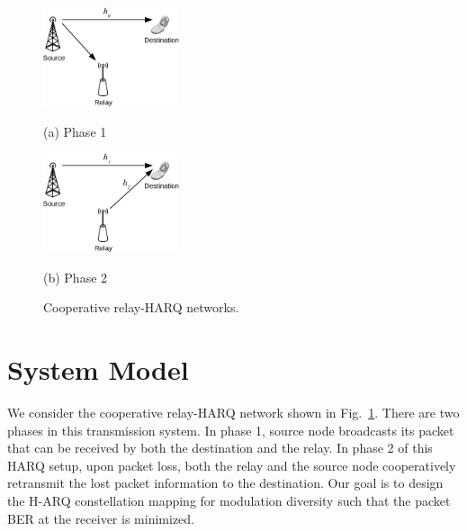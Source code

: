 \documentclass[journal,draftcls,onecolumn,12pt,twoside]{IEEEtran}
\begin{document}
\begin{figure}[!t]
    \begin{minipage}[b]{0.48\linewidth}
      \centering
      \centerline{\includegraphics[width=4.0cm]{./figs/relayHARQ1.eps}}
      \centerline{(a) Phase 1}\medskip
    \end{minipage}
    \hfill
    \begin{minipage}[b]{.48\linewidth}
      \centering
      \centerline{\includegraphics[width=4.0cm]{./figs/relayHARQ2.eps}}
      \centerline{(b) Phase 2}\medskip
    \end{minipage}
    \caption{Cooperative relay-HARQ networks.}
    \label{fig:system_model}
\end{figure}



\section{System Model}
\label{sec:model}
We consider the cooperative relay-HARQ network shown in
Fig.~\ref{fig:system_model}. There are two phases in this transmission system.
In phase 1, source node broadcasts its packet that can be received by both the
destination and the relay. In phase 2 of this HARQ setup, upon packet loss,
both the relay and the source node cooperatively retransmit the lost packet
information to the destination. Our goal is to design the H-ARQ constellation
mapping for modulation diversity such that the packet BER at the receiver is
minimized.
\end{document}
